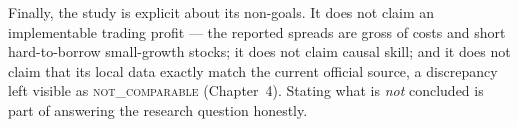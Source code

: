 Finally, the study is explicit about its non-goals. It does not claim an
implementable trading profit --- the reported spreads are gross of costs and
short hard-to-borrow small-growth stocks; it does not claim causal skill;
and it does not claim that its local data exactly match the current
official source, a discrepancy left visible as \textsc{not\_comparable}
(Chapter~4). Stating what is \emph{not} concluded is part of answering the
research question honestly.

